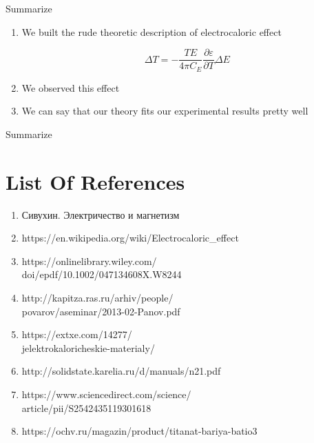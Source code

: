 \documentclass [xcolor=svgnames, t] {beamer}
\begin{document}
 \begin{frame}{Summarize}
\vspace{1,2 cm}
\begin{enumerate}
    \item
We built the rude theoretic description of electrocaloric effect
\begin{block}{}
    
\begin{equation}
    \Delta T = -\frac{TE}{4\pi C_E} \frac{\partial \varepsilon}{\partial T} \Delta E
\end{equation}
\end{block}

\item We observed this effect
\item We can say that our theory fits our experimental results pretty well
\end{enumerate}
\end{frame}
 \begin{frame}{Summarize}
 \end{frame}
 
 \section{List Of References}
 \begin{frame}{}
     

\begin{enumerate}
    \item Сивухин. Электричество и магнетизм
    \item https://en.wikipedia.org/wiki/Electrocaloric\_effect
    \item https://onlinelibrary.wiley.com/\\doi/epdf/10.1002/047134608X.W8244
    \item http://kapitza.ras.ru/arhiv/people/\\povarov/aseminar/2013-02-Panov.pdf
    \item https://extxe.com/14277/\\jelektrokaloricheskie-materialy/
    \item http://solidstate.karelia.ru/d/manuals/n21.pdf
    \item https://www.sciencedirect.com/science/\\article/pii/S2542435119301618
    \item https://ochv.ru/magazin/product/titanat-bariya-batio3
    \end{enumerate}
    \end{frame}
\end{document}
